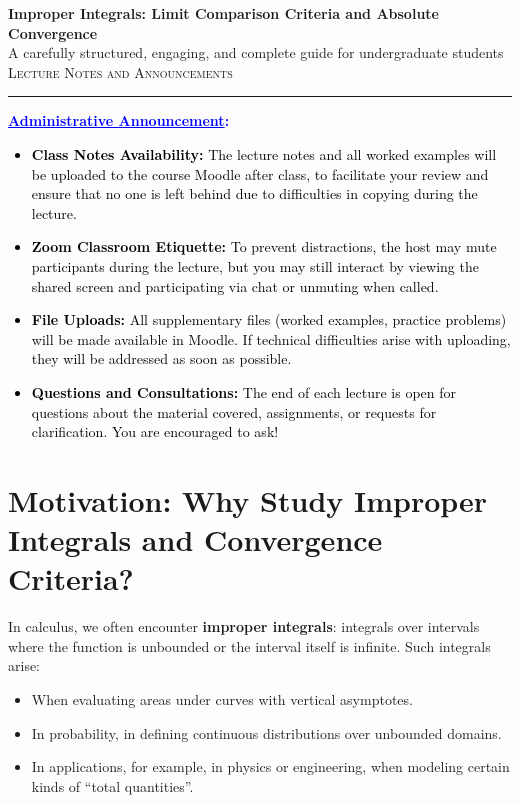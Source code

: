 \documentclass[12pt]{article}
\theoremstyle{definition}
\theoremstyle{plain}
\theoremstyle{remark}
\newenvironment{announcement}
  {\par\medskip\begin{center}\begin{Sbox}\begin{minipage}{0.92\textwidth}\small\bfseries\noindent\textcolor{blue}{\underline{Administrative Announcement}:}\par}
  {\end{minipage}\end{Sbox}\fbox{\TheSbox}\end{center}\medskip}
\begin{document}
\begin{center}
    \LARGE\textbf{Improper Integrals: Limit Comparison Criteria and Absolute Convergence} \\
    \large A carefully structured, engaging, and complete guide for undergraduate students \\
    \vspace{0.2cm}
    \normalsize\textsc{Lecture Notes and Announcements}
\end{center}

\vspace{1ex}

\hrule
\vspace{2ex}

\begin{announcement}
\textcolor{black}{
\begin{itemize}[leftmargin=*]
    \item \textbf{Class Notes Availability:} The lecture notes and all worked examples will be uploaded to the course Moodle after class, to facilitate your review and ensure that no one is left behind due to difficulties in copying during the lecture.
    \item \textbf{Zoom Classroom Etiquette:} To prevent distractions, the host may mute participants during the lecture, but you may still interact by viewing the shared screen and participating via chat or unmuting when called.
    \item \textbf{File Uploads:} All supplementary files (worked examples, practice problems) will be made available in Moodle. If technical difficulties arise with uploading, they will be addressed as soon as possible.
    \item \textbf{Questions and Consultations:} The end of each lecture is open for questions about the material covered, assignments, or requests for clarification. You are encouraged to ask!
\end{itemize}
}
\end{announcement}


\section{Motivation: Why Study Improper Integrals and Convergence Criteria?}

In calculus, we often encounter \textbf{improper integrals}: integrals over intervals where the function is unbounded or the interval itself is infinite. Such integrals arise:
\begin{itemize}
    \item When evaluating areas under curves with vertical asymptotes.
    \item In probability, in defining continuous distributions over unbounded domains.
    \item In applications, for example, in physics or engineering, when modeling certain kinds of ``total quantities''.
\end{itemize}
\end{document}

